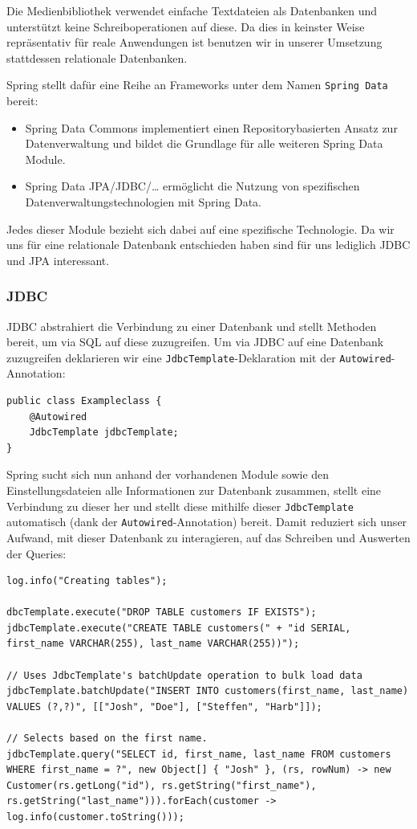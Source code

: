 \documentclass{article}
\begin{document}
Die Medienbibliothek verwendet einfache Textdateien als Datenbanken und unterstützt keine Schreiboperationen auf diese.
Da dies in keinster Weise repräsentativ für reale Anwendungen ist benutzen wir in unserer Umsetzung stattdessen relationale Datenbanken.

Spring stellt dafür eine Reihe an Frameworks unter dem Namen \texttt{Spring Data} bereit:
\begin{itemize}
        \item{Spring Data Commons} {implementiert einen Repositorybasierten Ansatz zur Datenverwaltung und bildet die Grundlage für alle weiteren Spring Data Module.}
        \item{Spring Data JPA/JDBC/\ldots} ermöglicht die Nutzung von spezifischen Datenverwaltungstechnologien mit Spring Data.
\end{itemize}

Jedes dieser Module bezieht sich dabei auf eine spezifische Technologie.
Da wir uns für eine relationale Datenbank entschieden haben sind für uns lediglich JDBC und JPA interessant.

\subsubsection{JDBC}

JDBC abstrahiert die Verbindung zu einer Datenbank und stellt Methoden bereit, um via SQL auf diese zuzugreifen.
Um via JDBC auf eine Datenbank zuzugreifen deklarieren wir eine \texttt{JdbcTemplate}-Deklaration mit der \texttt{Autowired}-Annotation:

\begin{lstlisting}
public class Exampleclass {
    @Autowired
    JdbcTemplate jdbcTemplate;
}
\end{lstlisting}

Spring sucht sich nun anhand der vorhandenen Module sowie den Einstellungsdateien alle Informationen zur Datenbank zusammen, stellt eine Verbindung zu dieser her und stellt diese mithilfe dieser \texttt{JdbcTemplate} automatisch (dank der \texttt{Autowired}-Annotation) bereit.
Damit reduziert sich unser Aufwand, mit dieser Datenbank zu interagieren, auf das Schreiben und Auswerten der Queries:

\begin{lstlisting}
log.info("Creating tables");

dbcTemplate.execute("DROP TABLE customers IF EXISTS");
jdbcTemplate.execute("CREATE TABLE customers(" + "id SERIAL, first_name VARCHAR(255), last_name VARCHAR(255))");

// Uses JdbcTemplate's batchUpdate operation to bulk load data
jdbcTemplate.batchUpdate("INSERT INTO customers(first_name, last_name) VALUES (?,?)", [["Josh", "Doe"], ["Steffen", "Harb"]]);

// Selects based on the first name.
jdbcTemplate.query("SELECT id, first_name, last_name FROM customers WHERE first_name = ?", new Object[] { "Josh" }, (rs, rowNum) -> new Customer(rs.getLong("id"), rs.getString("first_name"), rs.getString("last_name"))).forEach(customer -> log.info(customer.toString()));
\end{lstlisting}
\end{document}
